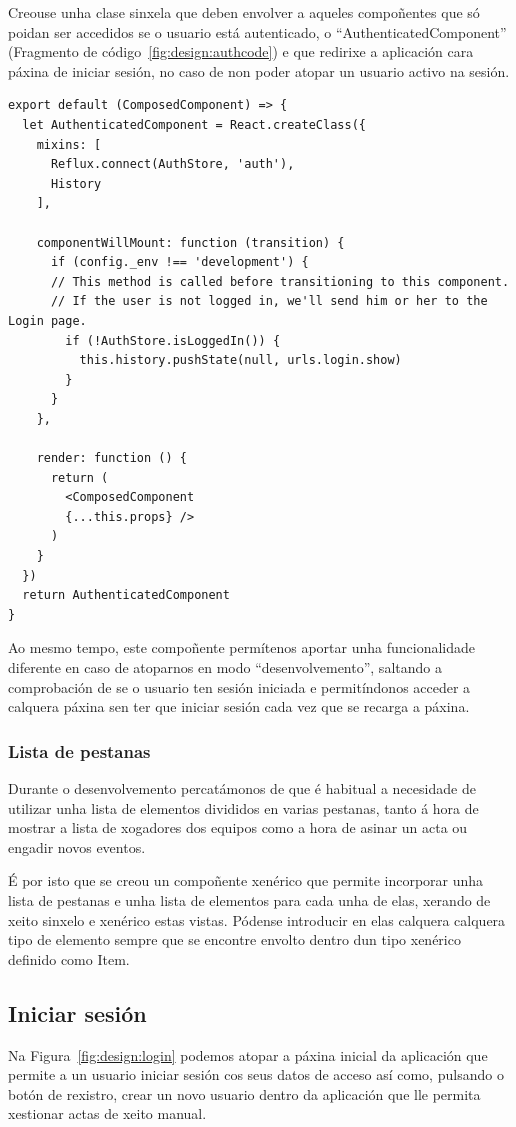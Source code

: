       Creouse unha clase sinxela que deben envolver a aqueles compoñentes que 
só poidan ser accedidos se o usuario está autenticado, o 
``AuthenticatedComponent'' (Fragmento de código~\ref{fig:design:authcode}) e 
que redirixe a aplicación cara páxina de iniciar sesión, no caso de non poder 
atopar un usuario activo na sesión.

    \lstset{}
    \begin{lstlisting}[caption=Compoñente de autenticación., 
label=fig:design:authcode]
export default (ComposedComponent) => {
  let AuthenticatedComponent = React.createClass({
    mixins: [
      Reflux.connect(AuthStore, 'auth'),
      History
    ],

    componentWillMount: function (transition) {
      if (config._env !== 'development') {
      // This method is called before transitioning to this component.
      // If the user is not logged in, we'll send him or her to the Login page.
        if (!AuthStore.isLoggedIn()) {
          this.history.pushState(null, urls.login.show)
        }
      }
    },

    render: function () {
      return (
        <ComposedComponent
        {...this.props} />
      )
    }
  })
  return AuthenticatedComponent
}
    \end{lstlisting}

    Ao mesmo tempo, este compoñente permítenos aportar unha funcionalidade 
diferente en caso de atoparnos en modo ``desenvolvemento'', saltando a 
comprobación de se o usuario ten sesión iniciada e permitíndonos acceder a 
calquera páxina sen ter que iniciar sesión cada vez que se recarga a páxina.

      \subsubsection{Lista de pestanas}
      Durante o desenvolvemento percatámonos de que é habitual a necesidade de 
utilizar unha lista de elementos divididos en varias pestanas, tanto á hora de 
mostrar a lista de xogadores dos equipos como a hora de asinar un acta ou 
engadir novos eventos.

      É por isto que se creou un compoñente xenérico que permite incorporar 
unha lista de pestanas e unha lista de elementos para cada unha de elas, 
xerando de xeito sinxelo e xenérico estas vistas. Pódense introducir 
en elas calquera calquera tipo de elemento sempre que se encontre envolto 
dentro dun tipo xenérico definido como Item.

    \subsection{Iniciar sesión}
    Na Figura~\ref{fig:design:login} podemos atopar a 
páxina inicial da aplicación que permite a un 
usuario iniciar sesión cos seus datos de acceso así como, pulsando o botón de 
rexistro, crear un novo usuario dentro da aplicación que lle permita xestionar
actas de xeito manual.

